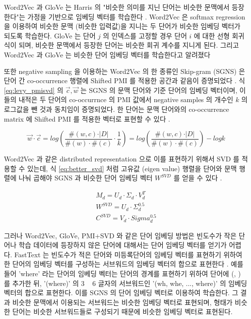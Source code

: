 \documentclass[11pt]{article}
\begin{document}
Word2Vec 과 GloVe 는 Harris 의 "비슷한 의미를 지닌 단어는 비슷한 문맥에서 등장한다"는 가정을 기반으로 임베딩 벡터를 학습한다 \citep{harris1954distributional}.
Word2Vec 은 softmax regression 을 이용하여 비슷한 문맥 (비슷한 입력값)을 지니는 두 단어가 비슷한 임베딩 벡터가 되도록 학습한다.
GloVe 는 단어 $j$ 의 인덱스를 고정할 경우 단어 $i$ 에 대한 선형 회귀식이 되며, 비슷한 문맥에서 등장한 단어는 비슷한 회귀 계수를 지니게 된다.
그리고 Word2Vec 과 GloVe 는 비슷한 단어 임베딩 벡터를 학습한다고 알려졌다 \citep{levy2015improving}

또한 negative sampling 을 이용하는 Word2Vec 의 한 종류인 Skip-gram (SGNS) 은 단어 간 co-occurrence 행렬에 Shifted PMI 를 적용한 공간과 같음이 증명되었다 \citep{levy2014neural}.
식 \ref{eq:levy_pmisvd} 의 $\vec{c}, \vec{w}$ 는 SGNS 의 문맥 단어와 기준 단어의 임베딩 벡터이며, 이들의 내적은 두 단어의 co-occurrnce 의 PMI 값에서 negative samples 의 개수인 $k$ 의 로그값을 뺀 것과 동치임이 증명되었다.
한 단어는 문맥 단어와의 co-occurrence matrix 에 Shifted PMI 를 적용한 벡터로 표현할 수 있다 \citep{levy2014neural}.

\begin{equation}
  \label{eq:levy_pmisvd}
  \vec{w} \cdot \vec{c} = log \left( \frac{\#(w,c) \cdot \vert D \vert}{\#(w) \cdot \#(c)} \cdot \frac{1}{k} \right) = log \left( \frac{\#(w,c) \cdot \vert D \vert}{\#(w) \cdot \#(c)} \right) - log k
\end{equation}

Word2Vec 과 같은 distributed representation 으로 이를 표현하기 위해서 SVD 를 적용할 수 있는데, 식 \ref{eq:better_svd} 처럼 고유값 (eigen value) 행렬을 단어와 문맥 행렬에 나눠 곱해야 SGNS 과 비슷한 단어 임베딩 벡터 $W^{SVD}$ 를 얻을 수 있다 \citep{levy2015improving}.

\begin{equation}
  \label{eq:better_svd}
  \begin{aligned}
  M_d = U_d \cdot \Sigma_d \cdot V_d^T \\
  W^{SVD} = U_d \cdot \Sigma_d^{0.5} \\
  C^{SVD} = V_d \cdot Sigma_d^{0.5}
  \end{aligned}
\end{equation}


그러나 Word2Vec, GloVe, PMI+SVD 와 같은 단어 임베딩 방법은 빈도수가 작은 단어나 학습 데이터에 등장하지 않은 단어에 대해서는 단어 임베딩 벡터를 얻기가 어렵다.
FastText 는 빈도수가 적은 단어와 미등록단어의 임베딩 벡터를 표현하기 위하여 한 단어의 임베딩 벡터를 구성하는 서브워드의 임베딩 벡터의 합으로 표현한다 \citep{bojanowski2017enriching}.
예를 들어 'where' 라는 단어의 임베딩 벡터는 단어의 경계를 표현하기 위하여 단어에 (, ) 를 추가한 뒤, '(where)' 의 3 ~ 6 글자의 서브워드인 '(wh, whe, ..., where)' 의 임베딩 벡터의 합으로 표현한다.
이를 SGNS 의 단어 임베딩 벡터로 이용하여 학습한다.
그 결과 비슷한 문맥에서 이용되는 서브워드는 비슷한 임베딩 벡터로 표현되며, 형태가 비슷한 단어는 비슷한 서브워드들로 구성되기 때문에 비슷한 임베딩 벡터로 표현된다.
\end{document}
